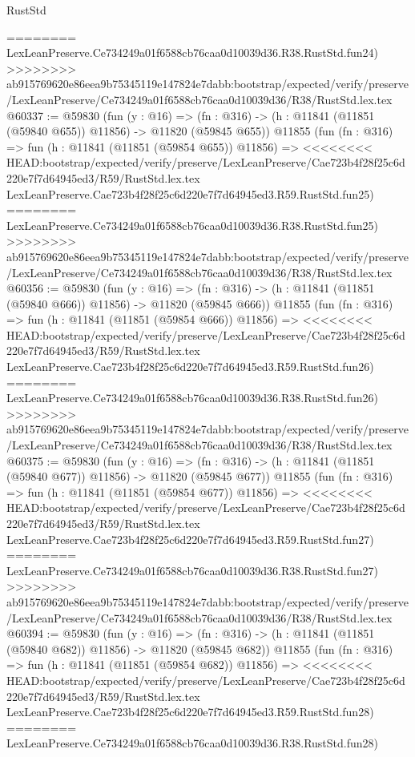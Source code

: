 \begin{lexlean}{RustStd}
\begin{coremodule}
{\begin{coremodule}
{{{{{{{{{{{{{{{{{{{{{{{{{{{{{{{{{{{{{{{{{{{{{{{{{{========
    LexLeanPreserve.Ce734249a01f6588cb76caa0d10039d36.R38.RustStd.fun24)
>>>>>>>> ab915769620e86eea9b75345119e147824e7dabb:bootstrap/expected/verify/preserve/LexLeanPreserve/Ce734249a01f6588cb76caa0d10039d36/R38/RustStd.lex.tex
@60337 := @59830
    (fun (y : @16) =>
    (fn : @316) -> (h : @11841 (@11851 (@59840 @655)) @11856) -> @11820 (@59845 @655))
    @11855
    (fun (fn : @316) =>
    fun (h : @11841 (@11851 (@59854 @655)) @11856) =>
<<<<<<<< HEAD:bootstrap/expected/verify/preserve/LexLeanPreserve/Cae723b4f28f25c6d220e7f7d64945ed3/R59/RustStd.lex.tex
    LexLeanPreserve.Cae723b4f28f25c6d220e7f7d64945ed3.R59.RustStd.fun25)
========
    LexLeanPreserve.Ce734249a01f6588cb76caa0d10039d36.R38.RustStd.fun25)
>>>>>>>> ab915769620e86eea9b75345119e147824e7dabb:bootstrap/expected/verify/preserve/LexLeanPreserve/Ce734249a01f6588cb76caa0d10039d36/R38/RustStd.lex.tex
@60356 := @59830
    (fun (y : @16) =>
    (fn : @316) -> (h : @11841 (@11851 (@59840 @666)) @11856) -> @11820 (@59845 @666))
    @11855
    (fun (fn : @316) =>
    fun (h : @11841 (@11851 (@59854 @666)) @11856) =>
<<<<<<<< HEAD:bootstrap/expected/verify/preserve/LexLeanPreserve/Cae723b4f28f25c6d220e7f7d64945ed3/R59/RustStd.lex.tex
    LexLeanPreserve.Cae723b4f28f25c6d220e7f7d64945ed3.R59.RustStd.fun26)
========
    LexLeanPreserve.Ce734249a01f6588cb76caa0d10039d36.R38.RustStd.fun26)
>>>>>>>> ab915769620e86eea9b75345119e147824e7dabb:bootstrap/expected/verify/preserve/LexLeanPreserve/Ce734249a01f6588cb76caa0d10039d36/R38/RustStd.lex.tex
@60375 := @59830
    (fun (y : @16) =>
    (fn : @316) -> (h : @11841 (@11851 (@59840 @677)) @11856) -> @11820 (@59845 @677))
    @11855
    (fun (fn : @316) =>
    fun (h : @11841 (@11851 (@59854 @677)) @11856) =>
<<<<<<<< HEAD:bootstrap/expected/verify/preserve/LexLeanPreserve/Cae723b4f28f25c6d220e7f7d64945ed3/R59/RustStd.lex.tex
    LexLeanPreserve.Cae723b4f28f25c6d220e7f7d64945ed3.R59.RustStd.fun27)
========
    LexLeanPreserve.Ce734249a01f6588cb76caa0d10039d36.R38.RustStd.fun27)
>>>>>>>> ab915769620e86eea9b75345119e147824e7dabb:bootstrap/expected/verify/preserve/LexLeanPreserve/Ce734249a01f6588cb76caa0d10039d36/R38/RustStd.lex.tex
@60394 := @59830
    (fun (y : @16) =>
    (fn : @316) -> (h : @11841 (@11851 (@59840 @682)) @11856) -> @11820 (@59845 @682))
    @11855
    (fun (fn : @316) =>
    fun (h : @11841 (@11851 (@59854 @682)) @11856) =>
<<<<<<<< HEAD:bootstrap/expected/verify/preserve/LexLeanPreserve/Cae723b4f28f25c6d220e7f7d64945ed3/R59/RustStd.lex.tex
    LexLeanPreserve.Cae723b4f28f25c6d220e7f7d64945ed3.R59.RustStd.fun28)
========
    LexLeanPreserve.Ce734249a01f6588cb76caa0d10039d36.R38.RustStd.fun28)
}}}}}}}}}}}}}}}}}}}}}}}}}}}}}}}}}}}}}}}}}}}}}}}}}}
\end{coremodule}}
\end{coremodule}
\end{lexlean}
